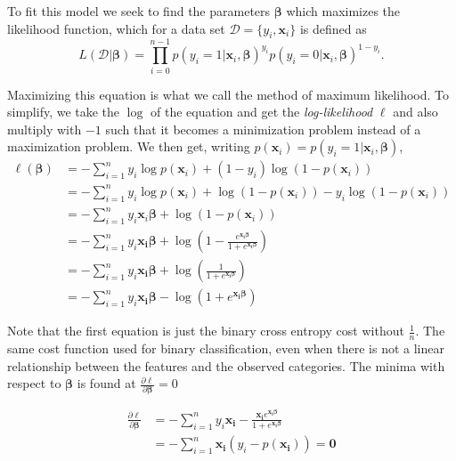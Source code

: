 \documentclass{article}
\theoremstyle{definition}
\begin{document}
To fit this model we seek to find the parameters $\boldsymbol{\beta}$ which maximizes the likelihood function, which for a data set $\mathcal{D} = \{y_i, \boldsymbol{x}_i\}$ is defined as
\begin{equation*}
    L\left( \mathcal{D} | \boldsymbol{\beta} \right) = \prod_{i = 0}^{n-1} p\left( y_i = 1 | \boldsymbol{x}_i, \boldsymbol{\beta} \right)^{y_i} p\left( y_i = 0 | \boldsymbol{x}_i, \boldsymbol{\beta} \right)^{1 - y_i}.
\end{equation*}

Maximizing this equation is what we call the method of maximum likelihood. To simplify, we take the $\log$ of the equation and get the \textit{log-likelihood} $\ell$ and also multiply with $-1$ such that it becomes a minimization problem instead of a maximization problem. We then get, writing $p(\boldsymbol{x}_i) = p\left( y_i = 1 | \boldsymbol{x}_i, \boldsymbol{\beta} \right)$,
\begin{align*}
    \ell(\boldsymbol{\beta})
    &= -\sum_{i=1}^{n} y_i\log p(\boldsymbol{x}_i) + (1 - y_i)\log(1 - p(\boldsymbol{x}_i))  \label{eq:BCE_cost}\\
    &= -\sum_{i=1}^{n} y_i\log p(\boldsymbol{x}_i) + \log(1 - p(\boldsymbol{x}_i)) - y_i\log(1 - p(\boldsymbol{x}_i)) \\
    & = -\sum_{i=1}^{n} y_i\boldsymbol{x}_i\boldsymbol{\beta} + \log(1 - p(\boldsymbol{x}_i))\\
    & = - \sum_{i=1}^{n} y_i\boldsymbol{x_i} \boldsymbol{\beta} + \log \left( 1 - \frac{e^{\boldsymbol{x_i} \boldsymbol{\beta}}}{1 + e^{\boldsymbol{x_i \beta}}} \right)\\
    & = - \sum_{i=1}^{n} y_i\boldsymbol{x_i} \boldsymbol{\beta} + \log\left( \frac{1}{ 1 + e^{\boldsymbol{x_i \beta} }} \right)\\
    & =  - \sum_{i=1}^{n} y_i\boldsymbol{x_i} \boldsymbol{\beta} - \log\left( 1 + e^{\boldsymbol{x_i \beta} } \right)
\end{align*}

Note that the first equation is just the binary cross entropy cost without $\frac{1}{n}$. The same cost function used for binary classification, even when there is not a linear relationship between the features and the observed categories. The minima with respect to $\boldsymbol{\beta}$ is found at $\frac{\partial \ell }{\partial \boldsymbol{\beta}} = 0$ 

\begin{align*}
    \frac{\partial \ell }{\partial \boldsymbol{\beta}} &= - \sum_{i=1}^{n} y_i\boldsymbol{x_i}  - \frac{\boldsymbol{x_i} e^{\boldsymbol{x_i\beta}}}{1 + e^{\boldsymbol{x_i \beta} }}\\
    &= - \sum_{i=1}^{n}\boldsymbol{x_i} \left(y_i  -  p(\boldsymbol{x_i})\right) = \boldsymbol{0}
\end{align*}
\end{document}
